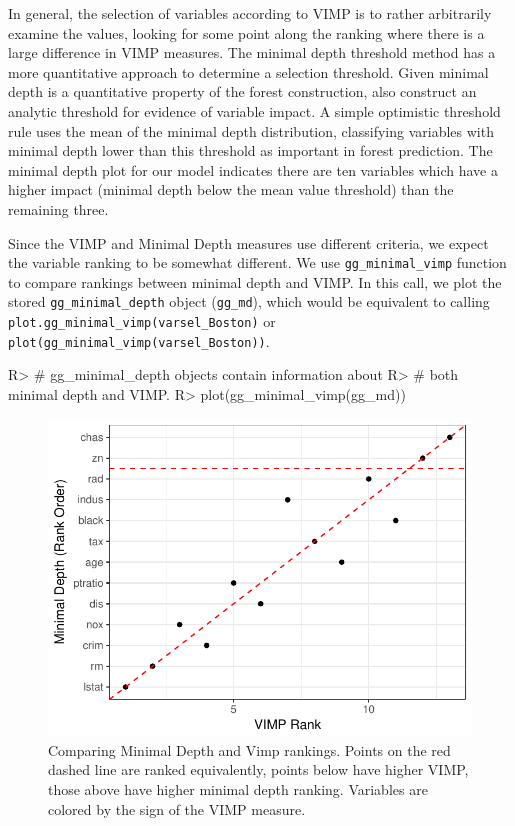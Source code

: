 \documentclass[article]{jss}
\begin{document}
In general, the selection of variables according to VIMP is to rather
arbitrarily examine the values, looking for some point along the ranking
where there is a large difference in VIMP measures. The minimal depth
threshold method has a more quantitative approach to determine a
selection threshold. Given minimal depth is a quantitative property of
the forest construction, \citep{Ishwaran:2010} also construct an
analytic threshold for evidence of variable impact. A simple optimistic
threshold rule uses the mean of the minimal depth distribution,
classifying variables with minimal depth lower than this threshold as
important in forest prediction. The minimal depth plot for our model
indicates there are ten variables which have a higher impact (minimal
depth below the mean value threshold) than the remaining three.

Since the VIMP and Minimal Depth measures use different criteria, we
expect the variable ranking to be somewhat different. We use
\texttt{gg\_minimal\_vimp} function to compare rankings between minimal
depth and VIMP. In this call, we plot the stored
\texttt{gg\_minimal\_depth} object (\texttt{gg\_md}), which would be
equivalent to calling \texttt{plot.gg\_minimal\_vimp(varsel\_Boston)} or
\texttt{plot(gg\_minimal\_vimp(varsel\_Boston))}.

\begin{CodeChunk}

\begin{CodeInput}
R> # gg_minimal_depth objects contain information about
R> # both minimal depth and VIMP.
R> plot(gg_minimal_vimp(gg_md))
\end{CodeInput}
\begin{figure}

{\centering \includegraphics{Regression-rfsrc_files/figure-latex/minimalvimp-1} 

}

\caption[Comparing Minimal Depth and Vimp rankings]{Comparing Minimal Depth and Vimp rankings. Points on the red dashed line are ranked equivalently, points below have higher VIMP, those above have higher minimal depth ranking. Variables are colored by the sign of the VIMP measure.}\label{fig:minimalvimp}
\end{figure}
\end{CodeChunk}
\end{document}
